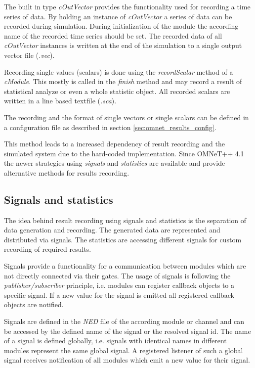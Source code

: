 The built in type \emph{cOutVector} provides the functionality used for recording a time series of data.
By holding an instance of \emph{cOutVector} a series of data can be recorded during simulation.
During initialization of the module the according name of the recorded time series should be set.
The recorded data of all \emph{cOutVector} instances is written at the end of the simulation to a single output vector file (\emph{.vec}). \cite[section 7.9.1]{omnet_manual}

Recording single values (scalars) is done using the \emph{recordScalar} method of a \emph{cModule}.
This mostly is called in the \emph{finish} method and may record a result of statistical analyze or even a whole statistic object.
All recorded scalars are written in a line based textfile (\emph{.sca}). \cite[section 7.9.2]{omnet_manual}

The recording and the format of single vectors or single scalars can be defined in a configuration file as described in section \ref{sec:omnet_results_config}.

This method leads to a increased dependency of result recording and the simulated system due to the hard-coded implementation.
Since OMNeT++ 4.1 the newer strategies using \emph{signals} and \emph{statistics} are available and provide alternative methods for results recording.

\subsection{Signals and statistics}
\label{sec:omnet_results_signals}
The idea behind result recording using signals and statistics is the separation of data generation and recording.
The generated data are represented and distributed via signals.
The statistics are accessing different signals for custom recording of required results. \cite[section 12.1.1]{omnet_manual}

Signals provide a functionality for a communication between modules which are not directly connected via their gates.
The usage of signals is following the \emph{publisher/subscriber} principle, i.e. modules can register callback objects to a specific signal.
If a new value for the signal is emitted all registered callback objects are notified.

Signals are defined in the \emph{NED} file of the according module or channel and can be accessed by the defined name of the signal or the resolved signal id.
The name of a signal is defined globally, i.e. signals with identical names in different modules represent the same global signal.
A registered listener of such a global signal receives notification of all modules which emit a new value for their signal. \cite[section 4.14]{omnet_manual}

